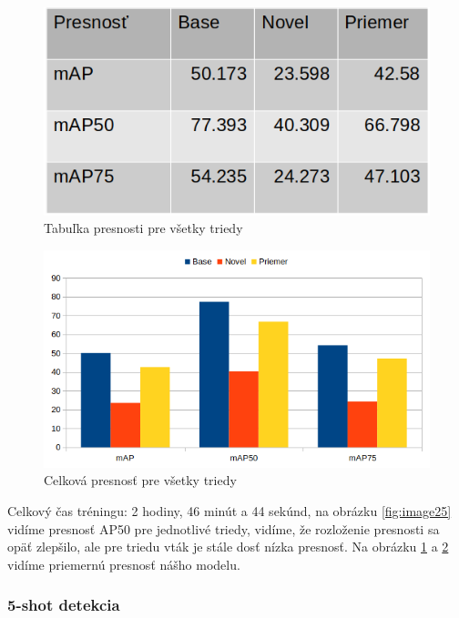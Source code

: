 \begin{figure}[H]
\includegraphics[width=\textwidth]{images/3shot_table_meanAP.png}
\centering
\caption{Tabuľka presnosti pre všetky triedy}
\label{fig:image26}
\end{figure}

\begin{figure}[H]
\includegraphics[width=\textwidth]{images/3_shot_meanAP.png}
\centering
\caption{Celková presnosť pre všetky triedy}
\label{fig:image27}
\end{figure}

Celkový čas tréningu: 2 hodiny, 46 minút a 44 sekúnd, na obrázku \ref{fig:image25} vidíme presnosť AP50 pre jednotlivé triedy, vidíme, že rozloženie presnosti sa opäť zlepšilo, ale pre triedu vták je stále dosť nízka presnosť. Na obrázku \ref{fig:image26} a \ref{fig:image27} vidíme priemernú presnosť nášho modelu.

\subsubsection{5-shot detekcia}

